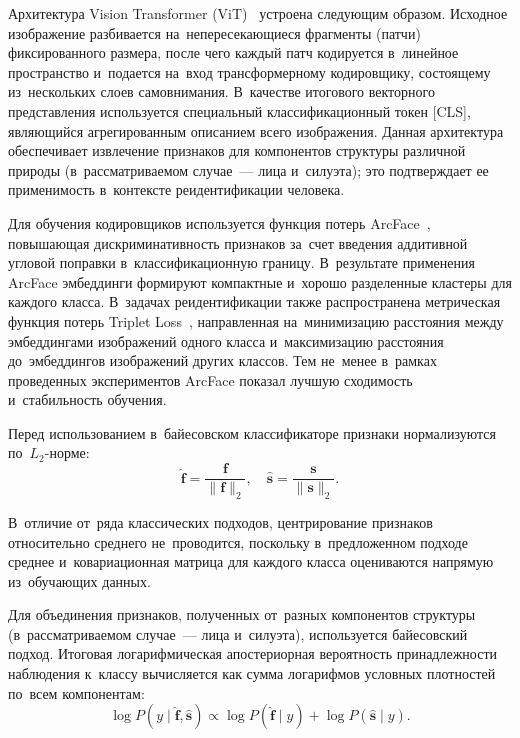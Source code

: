 Архитектура Vision Transformer (ViT)~\cite{Dosovitskiy2020vit} устроена
следующим образом. Исходное изображение разбивается
на~непересекающиеся фрагменты (патчи) фиксированного размера, после
чего каждый патч кодируется в~линейное пространство и~подается
на~вход трансформерному кодировщику, состоящему из~нескольких слоев
самовнимания. В~качестве итогового векторного представления
используется специальный классификационный токен [CLS], являющийся
агрегированным описанием всего изображения. Данная архитектура
обеспечивает извлечение признаков для компонентов структуры различной
природы (в~рассматриваемом случае~--- лица и~силуэта); это подтверждает
ее применимость в~контексте реидентификации человека.

Для обучения кодировщиков используется функция потерь
ArcFace~\cite{Deng2019arcface}, повышающая дискриминативность
признаков за~счет введения аддитивной угловой поправки
в~классификационную границу. В~результате применения ArcFace
эмбеддинги формируют компактные и~хорошо разделенные кластеры для
каждого класса. В~задачах реидентификации также распространена
метрическая функция потерь Triplet Loss~\cite{Hermans2017triplet},
направленная на~минимизацию расстояния между эмбеддингами
изображений одного класса и~максимизацию расстояния до~эмбеддингов
изображений других классов. Тем не~менее в~рамках проведенных
экспериментов ArcFace показал лучшую сходимость и~стабильность
обучения.

Перед использованием в~байесовском классификаторе признаки
нормализуются по~$L_2$-норме:
\begin{equation}\label{eq:ch3/l2norm}
    \hat{\mathbf{f}}=\frac{\mathbf{f}}{\lVert\mathbf{f}\rVert_2},\quad \hat{\mathbf{s}}=\frac{\mathbf{s}}{\lVert\mathbf{s}\rVert_2}.
\end{equation}

В~отличие от~ряда классических подходов, центрирование признаков
относительно среднего не~проводится, поскольку в~предложенном
подходе среднее и~ковариационная матрица для каждого класса
оцениваются напрямую из~обучающих данных.

Для объединения признаков, полученных от~разных компонентов структуры
(в~рассматриваемом случае~--- лица и~силуэта), используется байесовский
подход. Итоговая логарифмическая апостериорная вероятность
принадлежности наблюдения к~классу вычисляется как сумма логарифмов
условных плотностей по~всем компонентам:
\begin{equation}\label{eq:ch3/log-posterior}
    \log P(y\mid\hat{\mathbf{f}},\hat{\mathbf{s}})\propto\log P(\hat{\mathbf{f}}\mid y)+\log P(\hat{\mathbf{s}}\mid y).
\end{equation}

